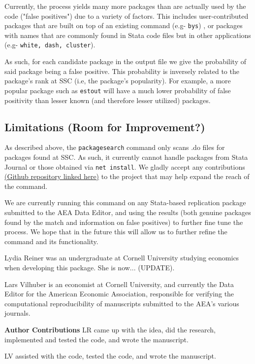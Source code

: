 Currently, the process yields many more packages than are actually used by the code ("false positives") due to a variety of factors. This includes user-contributed packages that are built on top of an existing command (e.g- \texttt{bys}) , or packages with names that are commonly found in Stata code files but in other applications (e.g- \texttt{white, dash, cluster}). 

As such, for each candidate package in the output file we give the probability of said package being a false positive. This probability is inversely related to the package's rank at SSC (i.e, the package's popularity). For example, a more popular package such as \texttt{estout} will have a much lower probability of false positivity than lesser known (and therefore lesser utilized) packages.


\subsection{Limitations (Room for Improvement?)}

As described above, the \texttt{packagesearch} command only scans .do files for packages found at SSC. As such, it currently cannot handle packages from Stata Journal or those obtained via \texttt{net install}. 
We gladly accept any contributions \href{https://github.com/lydreiner/Statapackagesearch}{(Github repository linked here)} to the project that may help expand the reach of the command.

We are currently running this command on any Stata-based replication package submitted to the AEA Data Editor, and using the results (both genuine packages found by the match and information on false positives) to further fine tune the process. We hope that in the future this will allow us to further refine the command and its functionality.  


%







\begin{aboutauthors}
Lydia Reiner was an undergraduate at Cornell University studying economics when developing this package. She is now... (UPDATE).

Lars Vilhuber is an economist at Cornell University, and currently the Data Editor for the American Economic Association, responsible for verifying the computational reproducibility of manuscripts submitted to the AEA's various journals.

\textbf{Author Contributions}
LR came up with the idea, did the research, implemented and tested the code, and wrote the manuscript.

LV assisted with the code, tested the code, and wrote the manuscript.

\end{aboutauthors}



